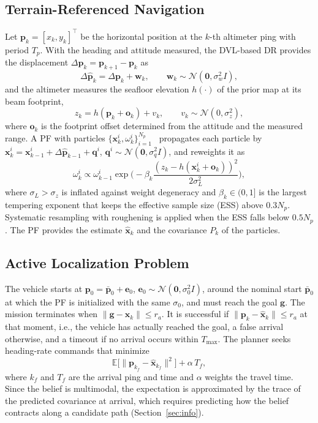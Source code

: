 \documentclass[letterpaper, 10 pt, journal, twoside]{IEEEtran}
\newcommand{\bp}{\mathbf{p}}
\newcommand{\bx}{\mathbf{x}}
\newcommand{\bg}{\mathbf{g}}
\newcommand{\bo}{\mathbf{o}}
\begin{document}
\subsection{Terrain-Referenced Navigation}
Let $\bp_k = [x_k, y_k]^\top$ be the horizontal position at the $k$-th altimeter ping with period $T_p$. With the heading and attitude measured, the DVL-based DR provides the displacement $\Delta\bp_k = \bp_{k+1} - \bp_k$ as
\begin{equation}
  \Delta\hat{\bp}_k = \Delta\bp_k + \mathbf{w}_k, \qquad \mathbf{w}_k \sim \mathcal{N}(\mathbf{0}, \sigma_w^2 I),
  \label{eq:dr}
\end{equation}
and the altimeter measures the seafloor elevation $h(\cdot)$ of the prior map at its beam footprint,
\begin{equation}
  z_k = h(\bp_k + \bo_k) + v_k, \qquad v_k \sim \mathcal{N}(0, \sigma_z^2),
  \label{eq:measurement}
\end{equation}
where $\bo_k$ is the footprint offset determined from the attitude and the measured range. A PF with particles $\{\bx_k^i, \omega_k^i\}_{i=1}^{N_p}$~\cite{arulampalam2002tutorial} propagates each particle by $\bx_{k}^i = \bx_{k-1}^i + \Delta\hat{\bp}_{k-1} + \mathbf{q}^i$, $\mathbf{q}^i \sim \mathcal{N}(\mathbf{0}, \sigma_q^2 I)$, and reweights it as
\begin{equation}
  \omega_k^i \propto \omega_{k-1}^i \exp\!\Big( -\beta_k \frac{(z_k - h(\bx_k^i + \bo_k))^2}{2\sigma_L^2} \Big),
  \label{eq:pf}
\end{equation}
where $\sigma_L > \sigma_z$ is inflated against weight degeneracy and $\beta_k \in (0,1]$ is the largest tempering exponent that keeps the effective sample size (ESS) above $0.3N_p$. Systematic resampling with roughening is applied when the ESS falls below $0.5N_p$. The PF provides the estimate $\hat{\bx}_k$ and the covariance $P_k$ of the particles.

\subsection{Active Localization Problem}
The vehicle starts at $\bp_0 = \bar{\bp}_0 + \mathbf{e}_0$, $\mathbf{e}_0 \sim \mathcal{N}(\mathbf{0}, \sigma_0^2 I)$, around the nominal start $\bar{\bp}_0$ at which the PF is initialized with the same $\sigma_0$, and must reach the goal $\bg$. The mission terminates when $\|\bg - \hat{\bx}_k\| \le r_a$. It is successful if $\|\bp_k - \hat{\bx}_k\| \le r_a$ at that moment, i.e., the vehicle has actually reached the goal, a false arrival otherwise, and a timeout if no arrival occurs within $T_{\max}$. The planner seeks heading-rate commands that minimize
\begin{equation}
  \mathbb{E}\big[\|\bp_{k_f} - \hat{\bx}_{k_f}\|^2\big] + \alpha\, T_f,
  \label{eq:objective}
\end{equation}
where $k_f$ and $T_f$ are the arrival ping and time and $\alpha$ weights the travel time. Since the belief is multimodal, the expectation is approximated by the trace of the predicted covariance at arrival, which requires predicting how the belief contracts along a candidate path (Section~\ref{sec:info}).
\end{document}
